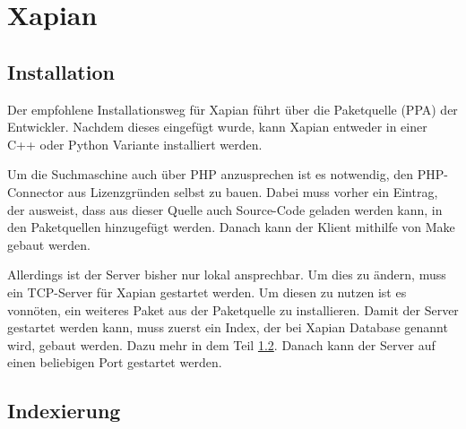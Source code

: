 
\section{Xapian}

\subsection{Installation}

Der empfohlene Installationsweg für Xapian führt über die Paketquelle (PPA) der Entwickler. Nachdem dieses eingefügt wurde, kann Xapian entweder in einer C++ oder Python Variante installiert werden. 

Um die Suchmaschine auch über PHP anzusprechen ist es notwendig, den PHP-Connector aus Lizenzgründen selbst zu bauen. Dabei muss vorher ein Eintrag, der ausweist, dass aus dieser Quelle auch Source-Code geladen werden kann, in den Paketquellen hinzugefügt werden. Danach kann der Klient mithilfe von Make gebaut werden.

Allerdings ist der Server bisher nur lokal ansprechbar. Um dies zu ändern, muss ein TCP-Server für Xapian gestartet werden. Um diesen zu nutzen ist es vonnöten, ein weiteres Paket aus der Paketquelle zu installieren. Damit der Server gestartet werden kann, muss zuerst ein Index, der bei Xapian Database genannt wird, gebaut werden. Dazu mehr in dem Teil \ref{xap:index}. Danach kann der Server auf einen beliebigen Port gestartet werden.

\subsection{Indexierung}
\label{xap:index}

